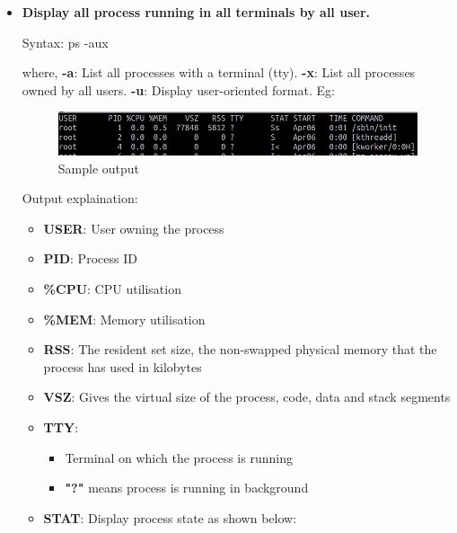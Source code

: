 \begin{flushleft}
\begin{itemize}
		
		\begin{itemize}
			\item \textbf{Display all process running in all terminals by all user.}
			\bigskip
			\begin{tcolorbox}[breakable,notitle,boxrule=-0pt,colback=pink,colframe=pink]
				\color{black}
				\font=9pt
				Syntax: ps -aux
				\font=4pt
			\end{tcolorbox}	
			where,
			\newline
			\textbf{-a}: List all processes with a terminal (tty).
			\newline
			\textbf{-x}: List all processes owned by all users.
			\newline
			\textbf{-u}: Display user-oriented format.
			\newline
			Eg: 
			\begin{figure}[h!]
				\centering
				\includegraphics[scale=.35]{content/chapter12/images/ps.png}
				\caption{Sample output}
				\label{fig:process234}
			\end{figure}
			\newline
			Output explaination:
			\begin{itemize}
				\item \textbf{USER}: User owning the process
				\item \textbf{PID}: Process ID
				\item \textbf{\%CPU}: CPU utilisation
				\item \textbf{\%MEM}: Memory utilisation
				\item \textbf{RSS}: The resident set size, the non-swapped physical memory that the process has used in kilobytes
				\item \textbf{VSZ}: Gives the virtual size of the process, code, data and stack segments
				\item \textbf{TTY}: 
				\begin{itemize}
					\item Terminal on which the process is running
					\item \textbf{"?"} means process is running in background
				\end{itemize}
				\item \textbf{STAT}: Display process state as shown below:
					\newline

\end{itemize}
\end{itemize}
\end{itemize}
\end{flushleft}
